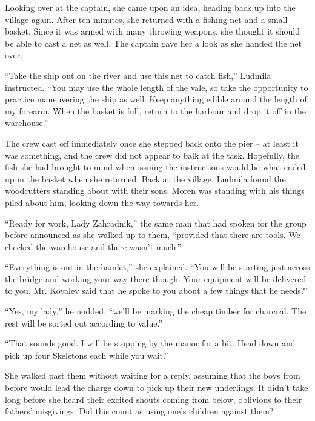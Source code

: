  

Looking over at the captain, she came upon an idea, heading back up into the village again. After ten minutes, she returned with a fishing net and a small basket. Since it was armed with many throwing weapons, she thought it should be able to cast a net as well. The captain gave her a look as she handed the net over.

 

“Take the ship out on the river and use this net to catch fish,” Ludmila instructed. “You may use the whole length of the vale, so take the opportunity to practice maneuvering the ship as well. Keep anything edible around the length of my forearm. When the basket is full, return to the harbour and drop it off in the warehouse.”

 

The crew cast off immediately once she stepped back onto the pier – at least it was something, and the crew did not appear to balk at the task. Hopefully, the fish she had brought to mind when issuing the instructions would be what ended up in the basket when she returned. Back at the village, Ludmila found the woodcutters standing about with their sons. Moren was standing with his things piled about him, looking down the way towards her.

 

“Ready for work, Lady Zahradnik,” the same man that had spoken for the group before announced as she walked up to them, “provided that there are tools. We checked the warehouse and there wasn’t much.”

 

“Everything is out in the hamlet,” she explained. “You will be starting just across the bridge and working your way there though. Your equipment will be delivered to you. Mr. Kovalev said that he spoke to you about a few things that he needs?”

 

“Yes, my lady,” he nodded, “we’ll be marking the cheap timber for charcoal. The rest will be sorted out according to value.”

 

“That sounds good. I will be stopping by the manor for a bit. Head down and pick up four Skeletons each while you wait.”

 

She walked past them without waiting for a reply, assuming that the boys from before would lead the charge down to pick up their new underlings. It didn’t take long before she heard their excited shouts coming from below, oblivious to their fathers’ misgivings. Did this count as using one’s children against them?

